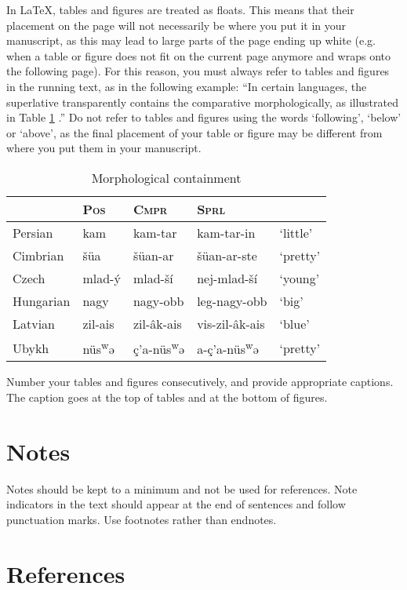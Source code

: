 \documentclass[times,linguex]{lsb}
\begin{document}
In \LaTeX, tables and figures are treated as floats. This means that their placement on the page will not necessarily be where you put it in your manuscript, as this may lead to large parts of the page ending up white (e.g. when a table or figure does not fit on the current page anymore and wraps onto the following page). For this reason, you must always refer to tables and figures in the running text, as in the following example: ``In certain languages, the superlative transparently contains the comparative morphologically, as illustrated in Table \ref{tbl:table1} \citep[46]{Bobaljik2012}.'' Do not refer to tables and figures using the words `following', `below' or `above', as the final placement of your table or figure may be different from where you put them in your manuscript.

\begin{table}[h]
\centering
\caption{Morphological containment}	
\begin{tabular}{lllll}
 & \textsc{Pos} & \textsc{Cmpr} & \textsc{Sprl}\\
\hline 
Persian & kam & kam-tar & kam-tar-in & ‘little’\\
Cimbrian & šüa & šüan-ar & šüan-ar-ste & ‘pretty’ \\
Czech & mlad-ý & mlad-ší & nej-mlad-ší & ‘young’\\
Hungarian & nagy & nagy-obb & leg-nagy-obb & ‘big’\\
Latvian & zil-ais & zil-âk-ais & vis-zil-âk-ais & ‘blue’\\
Ubykh &  nüs\textsuperscript{w}ə & ç’a-nüs\textsuperscript{w}ə & a-ç’a-nüs\textsuperscript{w}ə & ‘pretty’ \\
\end{tabular}\label{tbl:table1}
\end{table}

Number your tables and figures consecutively, and provide  appropriate captions. The caption goes at the top of tables and at the bottom of figures.

\section{Notes}

Notes should be kept to a minimum and not be used for references. Note indicators in the text should appear at the end of sentences and follow punctuation marks. Use footnotes rather than endnotes.

\section{References}
\end{document}
